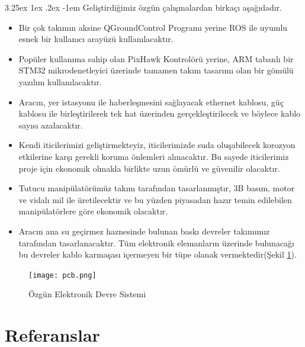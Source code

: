 \documentclass[12pt]{article}
\makeatletter
\renewcommand\paragraph{\@startsection{paragraph}{5}{\z@}%
  {3.25ex \@plus1ex \@minus.2ex}%
  {-1em}%
  {\normalfont\normalsize\bfseries}}
\makeatother
\begin{document}
\paragraph{} Geliştirdiğimiz özgün çalışmalardan birkaçı aşağıdadır.
\begin{itemize}
    \item Bir çok takımın aksine QGroundControl Programı yerine ROS ile uyumlu esnek bir kullanıcı arayüzü kullanılacaktır.
    
    \item Popüler kullanıma sahip olan PixHawk Kontrolörü yerine, ARM tabanlı bir STM32 mikrodenetleyici üzerinde tamamen takım tasarımı olan bir gömülü yazılım kullanılacaktır.
    \item Aracın, yer istasyonu ile haberleşmesini sağlayacak ethernet kablosu, güç kablosu ile birleştirilerek tek hat üzerinden gerçekleştirilecek ve böylece kablo sayısı azalacaktır.
    
    \item Kendi iticilerimizi geliştirmekteyiz, iticilerimizde suda oluşabilecek korozyon etkilerine karşı gerekli koruma önlemleri alınacaktır. Bu sayede iticilerimiz proje için ekonomik olmakla birlikte uzun ömürlü ve güvenilir olacaktır. 


    \item Tutucu manipülatörümüz takım tarafından tasarlanmıştır, 3B basım, motor ve vidalı mil ile üretilecektir ve bu yüzden piyasadan hazır temin edilebilen manipülatörlere göre ekonomik olacaktır. 

    \item Aracın ana su geçirmez haznesinde bulunan baskı devreler takımımız tarafından tasarlanacaktır. Tüm elektronik elemanların üzerinde bulunacağı bu devreler kablo karmaşası içermeyen bir tüpe olanak vermektedir(Şekil \ref{fig:pcb}). 

\end{itemize}

\begin{figure}[hbt!]
\centering
\texttt{[image: pcb.png]}
\caption{Özgün Elektronik Devre Sistemi}
\label{fig:pcb}
\end{figure}

\newpage
\section{Referanslar}
\vspace{-1cm}
\printbibliography[title={\textbf{ }}]
\end{document}
